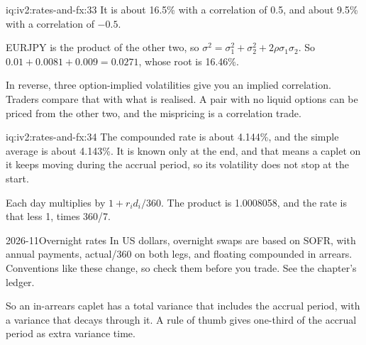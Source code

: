 \begin{solution}{iq:iv2:rates-and-fx:33}
It is about 16.5\% with a correlation of 0.5, and about 9.5\% with a correlation of $-0.5$.

EURJPY is the product of the other two, so $\sigma^2 = \sigma_1^2 + \sigma_2^2 + 2\rho\sigma_1\sigma_2$. So $0.01 + 0.0081 + 0.009 = 0.0271$, whose root is 16.46\%.

In reverse, three option-implied volatilities give you an implied correlation. Traders compare that with what is realised. A pair with no liquid options can be priced from the other two, and the mispricing is a correlation trade.

\end{solution}

\begin{solution}{iq:iv2:rates-and-fx:34}
The compounded rate is about 4.144\%, and the simple average is about 4.143\%. It is known only at the end, and that means a caplet on it keeps moving during the accrual period, so its volatility does not stop at the start.

Each day multiplies by $1 + r_id_i/360$. The product is 1.0008058, and the rate is that less 1, times 360/7.

\begin{dated}{2026-11}{Overnight rates}\label{dat:iv2:rates-and-fx:ois}
In US dollars, overnight swaps are based on SOFR, with annual payments, actual/360 on both legs, and floating compounded in arrears. Conventions like these change, so check them before you trade. See the chapter's ledger.
\end{dated}

So an in-arrears caplet has a total variance that includes the accrual period, with a variance that decays through it. A rule of thumb gives one-third of the accrual period as extra variance time.

\end{solution}

